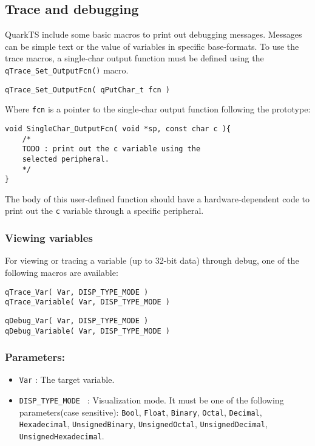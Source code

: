

\subsection{Trace and debugging}
QuarkTS include some basic macros to print out debugging messages. Messages can be simple text or the value of variables in specific base-formats. 
To use the trace macros, a single-char output function must be defined using the \lstinline{qTrace_Set_OutputFcn()} macro.
\medskip

\begin{lstlisting}[style=CStyle]
qTrace_Set_OutputFcn( qPutChar_t fcn )
\end{lstlisting}

Where \lstinline{fcn} is a pointer to the single-char output function following the prototype:
\medskip

\begin{lstlisting}[style=CStyle]
void SingleChar_OutputFcn( void *sp, const char c ){
    /*
    TODO : print out the c variable using the
    selected peripheral.
    */
}
\end{lstlisting}

The body of this user-defined function should have a hardware-dependent code to print out the \lstinline{c} variable through a specific peripheral.

\subsubsection{Viewing variables}
For viewing or tracing a variable (up to 32-bit data) through debug, one of the following macros are available:
   
\medskip

\begin{lstlisting}[style=CStyle]
qTrace_Var( Var, DISP_TYPE_MODE )
qTrace_Variable( Var, DISP_TYPE_MODE )
\end{lstlisting}
\begin{lstlisting}[style=CStyle]
qDebug_Var( Var, DISP_TYPE_MODE )
qDebug_Variable( Var, DISP_TYPE_MODE )
\end{lstlisting}

\subsubsection*{Parameters:}
\begin{itemize}
    \item \lstinline{Var} : The target variable. 
    \item \lstinline{DISP_TYPE_MODE } :  Visualization mode. It must be one of the following parameters(case sensitive): \lstinline{Bool}, \lstinline{Float}, \lstinline{Binary}, \lstinline{Octal}, \lstinline{Decimal}, \lstinline{Hexadecimal}, \lstinline{UnsignedBinary}, \lstinline{UnsignedOctal}, \lstinline{UnsignedDecimal}, \lstinline{UnsignedHexadecimal}. 
\end{itemize}

